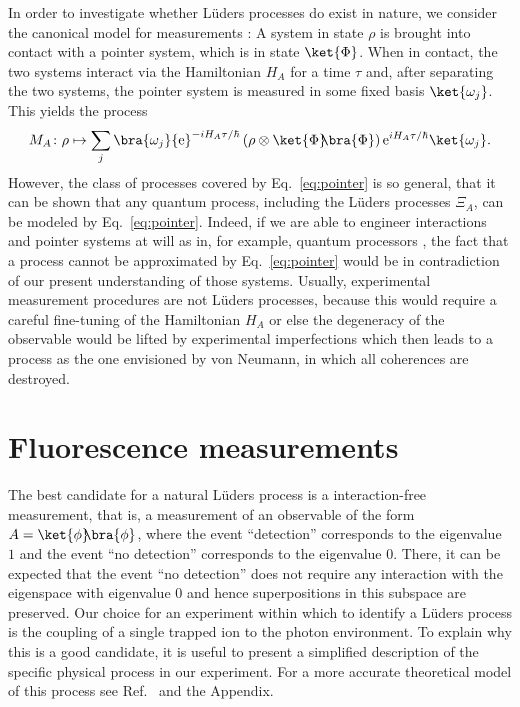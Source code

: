\documentclass[12pt,
onecolumn,
superscriptaddress,
floatfix,
]{revtex4-2}
\newcommand{\ee}{{\mathrm e}}
\newcommand{\ketbra}[2]{{\ket{#1}\!\!\bra{#2}}}
\newcommand{\proj}[1]{{\ketbra{#1}{#1}}}
\begin{document}
In order to investigate whether Lüders processes do exist in nature, we 
 consider the canonical model for measurements \cite{Peres95, Heinosaari12}:
A system in state $\rho$ is brought into contact with a pointer 
 system, which is in state $\ket{\Phi}$.
When in contact, the two systems interact via the Hamiltonian $H_A$ for a time 
 $\tau$ and, after separating the two systems, the pointer system is measured 
 in some fixed basis $\ket{\omega_j}$.
This yields the process
%
\begin{equation}\label{eq:pointer}
 M_A\colon \rho\mapsto
 \sum_j \bra{\omega_j}\ee^{-i H_A\tau/\hbar} \left(\rho\otimes \proj\Phi\right)
 \ee^{i H_A\tau/\hbar}\ket{\omega_j}.
\end{equation}
%
However, the class of processes covered by Eq.~\eqref{eq:pointer} is so 
 general, that it can be shown \cite{Heinosaari12} that any quantum process, 
 including the Lüders processes $\Xi_A$, can be modeled by 
 Eq.~\eqref{eq:pointer}.
Indeed, if we are able to engineer interactions and pointer systems at will as 
 in, for example, quantum processors \cite{Deutsch85, Barenco95}, the 
 fact that a process cannot be approximated by Eq.~\eqref{eq:pointer} would be 
 in contradiction of our present understanding of those systems.
Usually, experimental measurement procedures are not Lüders processes, because 
 this would require a careful fine-tuning of the Hamiltonian $H_A$ or else the degeneracy of the observable would be lifted by experimental 
 imperfections which then leads to a process as the one envisioned by von 
 Neumann, in which all coherences are destroyed.

\section{Fluorescence measurements}

The best candidate for a natural Lüders process is a interaction-free measurement, that 
 is, a measurement of an observable of the form $A= \proj{\phi}$, where the 
 event ``detection'' corresponds to the eigenvalue $1$ and the event ``no 
 detection'' corresponds to the eigenvalue $0$.
There, it can be expected that the event ``no detection'' does not require any 
 interaction with the eigenspace with eigenvalue $0$ and hence superpositions 
 in this subspace are preserved.
Our choice for an experiment within which to identify a Lüders process is the coupling
 of a single trapped ion to the photon environment.
To explain why this is a good candidate, it is useful to present a simplified 
 description of the specific physical process in our experiment.
 For a more 
 accurate theoretical model of this process see Ref.~\cite{Carmichael93} and 
 the Appendix.
\end{document}
